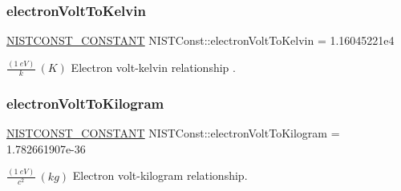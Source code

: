 \subsubsection{\texorpdfstring{electron\+Volt\+To\+Kelvin}{electronVoltToKelvin}}
{\footnotesize\ttfamily \mbox{\hyperlink{_n_i_s_t_const_8hpp_a2b0fc1d7452373f816175dd86ce26729}{N\+I\+S\+T\+C\+O\+N\+S\+T\+\_\+\+C\+O\+N\+S\+T\+A\+NT}} N\+I\+S\+T\+Const\+::electron\+Volt\+To\+Kelvin = 1.\+16045221e4}

$\frac{(1\ eV)}{k} \ (K)$ Electron volt-\/kelvin relationship . \mbox{\label{group___n_i_s_t_const-_electron_volt_gac875b0f36fd52d70256d4a3d86eebb2e}} 
\subsubsection{\texorpdfstring{electron\+Volt\+To\+Kilogram}{electronVoltToKilogram}}
{\footnotesize\ttfamily \mbox{\hyperlink{_n_i_s_t_const_8hpp_a2b0fc1d7452373f816175dd86ce26729}{N\+I\+S\+T\+C\+O\+N\+S\+T\+\_\+\+C\+O\+N\+S\+T\+A\+NT}} N\+I\+S\+T\+Const\+::electron\+Volt\+To\+Kilogram = 1.\+782661907e-\/36}

$\frac{(1\ eV)}{c^2} \ (kg)$ Electron volt-\/kilogram relationship. 